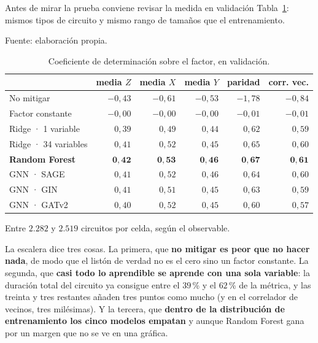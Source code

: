 Antes de mirar la prueba conviene revisar la medida en validación
Tabla~\ref{tab:escalera_val}: mismos tipos de circuito y mismo rango de tamaños que el entrenamiento.

\begin{table}[htbp]
    \centering
    \caption{Coeficiente de determinación sobre el factor, en validación.}
    \label{tab:escalera_val}
    {\footnotesize
    Fuente: elaboración propia. \begin{tabular}{@{}lrrrrr@{}}
        \toprule
        & \textbf{media $Z$} & \textbf{media $X$} & \textbf{media $Y$}
        & \textbf{paridad} & \textbf{corr. vec.} \\
        \midrule
        No mitigar            & $-0{,}43$ & $-0{,}61$ & $-0{,}53$ & $-1{,}78$ & $-0{,}84$ \\
        Factor constante      & $-0{,}00$ & $-0{,}00$ & $-0{,}00$ & $-0{,}01$ & $-0{,}01$ \\
        Ridge · 1 variable    & $0{,}39$ & $0{,}49$ & $0{,}44$ & $0{,}62$ & $0{,}59$ \\
        Ridge · 34 variables  & $0{,}41$ & $0{,}52$ & $0{,}45$ & $0{,}65$ & $0{,}60$ \\
        \textbf{Random Forest} & $\bm{0{,}42}$ & $\bm{0{,}53}$ & $\bm{0{,}46}$ & $\bm{0{,}67}$ & $\bm{0{,}61}$ \\
        GNN · SAGE            & $0{,}41$ & $0{,}52$ & $0{,}46$ & $0{,}64$ & $0{,}60$ \\
        GNN · GIN             & $0{,}41$ & $0{,}51$ & $0{,}45$ & $0{,}63$ & $0{,}59$ \\
        GNN · GATv2           & $0{,}40$ & $0{,}52$ & $0{,}45$ & $0{,}60$ & $0{,}57$ \\
        \bottomrule
    \end{tabular}}

    {\footnotesize Entre $2{.}282$ y $2{.}519$ circuitos por
    celda, según el observable.}
\end{table}

La escalera dice tres cosas. La primera, que \textbf{no mitigar es peor que
no hacer nada}, de modo que el listón de verdad no es el cero sino un factor constante. La segunda,
que \textbf{casi todo lo aprendible se aprende con una sola variable}: la duración total del
circuito ya consigue entre el $39$\,\% y el $62$\,\% de la métrica, y las treinta y tres
restantes añaden tres puntos como mucho (y en el correlador de vecinos, tres milésimas). Y la tercera, que \textbf{dentro de la distribución
de entrenamiento los cinco modelos empatan} y aunque Random Forest gana por un margen que no se ve en una gráfica.


